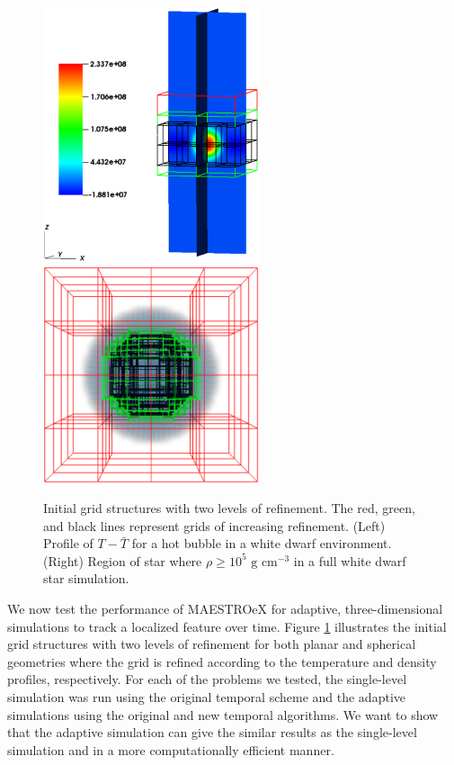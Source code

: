 \begin{figure}[htb]
\begin{center}
\includegraphics[width=2.5in]{./figs/reacting_bubble_amr} \hspace{2.5em}
\includegraphics[width=2.5in]{./figs/wdconvect_amr_3grid}
\caption{\label{fig:amr_grids} Initial grid structures with two levels of refinement. 
         The red, green, and black lines represent grids of increasing refinement. 
         (Left) Profile of $T - \bar{T}$ for a hot bubble in a white dwarf environment.
         (Right) Region of star where $\rho\ge 10^5 \text{ g cm}^{-3}$ in a full white dwarf star simulation. }
\end{center}
\end{figure}

We now test the performance of MAESTROeX for adaptive, three-dimensional simulations to track a localized feature over time. Figure \ref{fig:amr_grids} illustrates the initial grid structures with two levels of refinement for both planar and spherical geometries where the grid is refined according to the temperature and density profiles, respectively. For each of the problems we tested, the single-level simulation was run using the original temporal scheme and the adaptive simulations using the original and new temporal algorithms. We want to show that the adaptive simulation can give the similar results as the single-level simulation and in a more computationally efficient manner.

